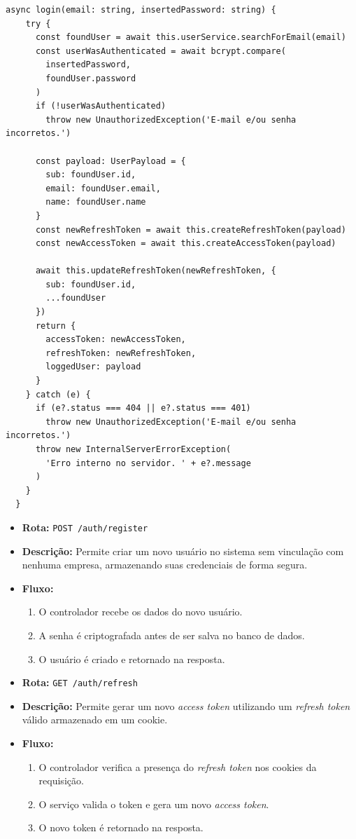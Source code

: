 \begin{lstlisting}[caption={Exemplo de \textit{service} para \textit{login}.},label={cod:login-service}]
	async login(email: string, insertedPassword: string) {
    try {
      const foundUser = await this.userService.searchForEmail(email)
      const userWasAuthenticated = await bcrypt.compare(
        insertedPassword,
        foundUser.password
      )
      if (!userWasAuthenticated)
        throw new UnauthorizedException('E-mail e/ou senha incorretos.')

      const payload: UserPayload = {
        sub: foundUser.id,
        email: foundUser.email,
        name: foundUser.name
      }
      const newRefreshToken = await this.createRefreshToken(payload)
      const newAccessToken = await this.createAccessToken(payload)

      await this.updateRefreshToken(newRefreshToken, {
        sub: foundUser.id,
        ...foundUser
      })
      return {
        accessToken: newAccessToken,
        refreshToken: newRefreshToken,
        loggedUser: payload
      }
    } catch (e) {
      if (e?.status === 404 || e?.status === 401)
        throw new UnauthorizedException('E-mail e/ou senha incorretos.')
      throw new InternalServerErrorException(
        'Erro interno no servidor. ' + e?.message
      )
    }
  }
\end{lstlisting}

\begin{itemize}
	\item \textbf{Rota:} \texttt{POST /auth/register}
	\item \textbf{Descrição:} Permite criar um novo usuário no sistema sem vinculação com nenhuma empresa, armazenando suas credenciais de forma segura.
	\item \textbf{Fluxo:}
	\begin{enumerate}
		\item O controlador recebe os dados do novo usuário.
		\item A senha é criptografada antes de ser salva no banco de dados.
		\item O usuário é criado e retornado na resposta.
	\end{enumerate}
\end{itemize}

\begin{itemize}
	\item \textbf{Rota:} \texttt{GET /auth/refresh}
	\item \textbf{Descrição:} Permite gerar um novo \textit{access token} utilizando um \textit{refresh token} válido armazenado em um cookie.
	\item \textbf{Fluxo:}
	\begin{enumerate}
		\item O controlador verifica a presença do \textit{refresh token} nos cookies da requisição.
		\item O serviço valida o token e gera um novo \textit{access token}.
		\item O novo token é retornado na resposta.
	\end{enumerate}
\end{itemize}

